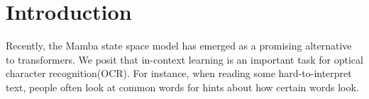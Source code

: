 \section{Introduction}
Recently, the Mamba state space model has emerged as a promising alternative to
transformers\cite{mamba}. 
We posit that in-context learning is an important task for optical character
recognition(OCR).
For instance, when reading some hard-to-interpret text, people often look at
common words for hints about how certain words look.
